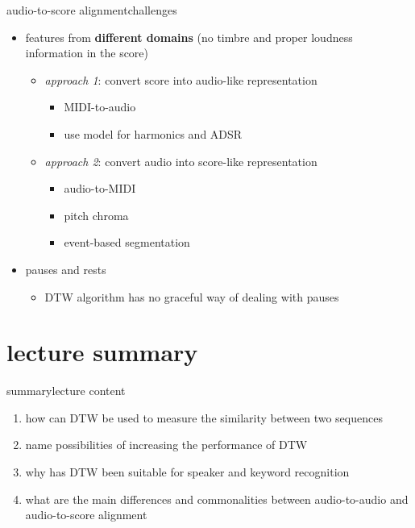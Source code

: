         \begin{frame}{audio-to-score alignment}{challenges}
            \begin{itemize}
                \item   features from \textbf{different domains} (no timbre and proper loudness information in the score)
                    \begin{itemize}
                        \item   \textit{approach 1}: convert score into audio-like representation
                            \begin{itemize}
                                \item   MIDI-to-audio
                                \item   use model for harmonics and ADSR
                            \end{itemize}
                        \item   \textit{approach 2}: convert audio into score-like representation
                            \begin{itemize}
                                \item   audio-to-MIDI 
                                \item   pitch chroma
                                \item   event-based segmentation
                            \end{itemize}
                    \end{itemize}
                \bigskip
                \item<2->   pauses and rests
                    \begin{itemize}
                        \item   DTW algorithm has no graceful way of dealing with pauses
                    \end{itemize}
            \end{itemize}
        \end{frame}



    \section[summary]{lecture summary}
        \begin{frame}{summary}{lecture content}
            \begin{enumerate}
                \item   how can DTW be used to measure the similarity between two sequences
                \smallskip
                \item<2->   name possibilities of increasing the performance of DTW
                \smallskip
                \item<3->   why has DTW been suitable for speaker and keyword recognition
                \smallskip
                \item<4->   what are the main differences and commonalities between audio-to-audio and audio-to-score alignment
            \end{enumerate}
        \end{frame}


